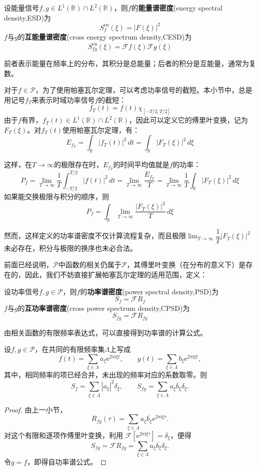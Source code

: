 \begin{definition}[能量谱密度]
    设能量信号$f,g\in L^1(\mathbb{R})\cap L^2(\mathbb{R})$，则$f$的\textbf{能量谱密度}(energy spectral density,ESD)为
    $$S^{\text{en}}_f(\xi)=|F(\xi)|^2$$
    $f$与$g$的\textbf{互能量谱密度}(cross energy spectrum density,CESD)为$$S^{\text{en}}_{fg}(\xi)=\mathcal{F}f(\xi)\overline{\mathcal{F}g(\xi)}$$
\end{definition}
前者表示能量在频率上的分布，其积分是总能量；后者的积分是互能量，通常为复数。

对于$f\in \mathcal{P}$，为了使用帕塞瓦尔定理，可以考虑功率信号的截短。本小节中，总是用记号$f_T$来表示时域功率信号$f$的截短：
$$f_T(t)=f(t)\chi_{[-T/2,T/2]}$$
由于$f$有界，$f_T(t)\in L^1(\mathbb{R})\cap L^2(\mathbb{R})$，因此可以定义它的傅里叶变换，记为$F_T(\xi)$。对$f_T(t)$使用帕塞瓦尔定理，有：
$$E_{f_T}=\int_{\mathbb{R}}|f_T(t)|^2\,dt=\int_{\mathbb{R}}|F_T(\xi)|^2\,d\xi$$

这样，在$T\to\infty$的极限存在时，$E_{f_T}$的时间平均值就是$f$的功率：
$$P_f=\lim_{T\to\infty}\frac{1}{T}\int_{-T/2}^{T/2}|f(t)|^2\,dt=\lim_{T\to\infty}\frac{E_{f_T}}{T}=\lim_{T\to\infty}\frac{1}{T}\int_{\mathbb{R}}|F_T(\xi)|^2\,d\xi$$
如果能交换极限与积分的顺序，则
$$P_f=\int_{\mathbb{R}}\lim_{T\to\infty}\frac{|F_T(\xi)|^2}{T}\,d\xi$$

然而，这样定义的功率谱密度不仅计算流程复杂，而且极限$\lim_{T\to\infty}\dfrac{1}{T}|F_T(\xi)|^2$未必存在，积分与极限的换序也未必合法。

前面已经说明，$\mathcal{P}$中函数的相关仍属于$\mathcal{P}$，其傅里叶变换（在分布的意义下）是存在的，因此，我们不妨直接扩展帕塞瓦尔定理的适用范围，定义：

\begin{definition}[功率谱密度]
    设功率信号$f,g\in\mathcal{P}$，则$f$的\textbf{功率谱密度}(power spectral density,PSD)为
    $$S_f=\mathcal{F}R_f$$
    $f$与$g$的\textbf{互功率谱密度}(cross power spectrum density,CPSD)为
    $$S_{fg}=\mathcal{F}R_{fg}$$
\end{definition}

由相关函数的有限频率表达式，可以直接得到功率谱的计算公式。

\begin{theorem}[有限频率信号的功率谱]\label{thm:PSD}
    设$f,g\in\mathcal{P}$，在共同的有限频率集$\Lambda$上写成
    $$
        f(t)=\sum_{\xi\in\Lambda}a_\xi\mathrm{e}^{2\pi\mathrm{i}\xi t},
        \qquad
        g(t)=\sum_{\xi\in\Lambda}b_\xi\mathrm{e}^{2\pi\mathrm{i}\xi t},
    $$
    其中，相同频率的项已经合并，未出现的频率对应的系数取零。则
    $$
        S_f=\sum_{\xi\in\Lambda}|a_\xi|^2\delta_\xi,
        \qquad
        S_{fg}=\sum_{\xi\in\Lambda}a_\xi\overline{b_\xi}\delta_\xi.
    $$
\end{theorem}
\begin{proof}
    由上一小节，
    $$
        R_{fg}(\tau)=\sum_{\xi\in\Lambda}
        a_\xi\overline{b_\xi}\mathrm{e}^{2\pi\mathrm{i}\xi\tau}.
    $$
    对这个有限和逐项作傅里叶变换，利用
    $\mathcal{F}[\mathrm{e}^{2\pi\mathrm{i}\xi\tau}]=\delta_\xi$，便得
    $$
        S_{fg}=\mathcal{F}R_{fg}
        =\sum_{\xi\in\Lambda}a_\xi\overline{b_\xi}\delta_\xi.
    $$
    令$g=f$，即得自功率谱公式。
\end{proof}

